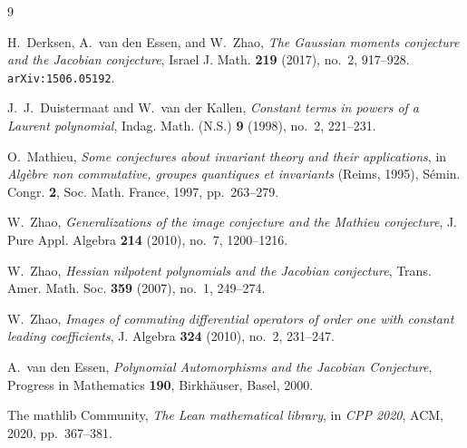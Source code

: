 \documentclass[11pt,reqno]{amsart}
\theoremstyle{plain}
\theoremstyle{definition}
\begin{document}
\begin{thebibliography}{9}

H.~Derksen, A.~van den Essen, and W.~Zhao,
\emph{The Gaussian moments conjecture and the Jacobian conjecture},
Israel J. Math. \textbf{219} (2017), no.~2, 917--928. \texttt{arXiv:1506.05192}.

J.~J.~Duistermaat and W.~van der Kallen,
\emph{Constant terms in powers of a Laurent polynomial},
Indag. Math. (N.S.) \textbf{9} (1998), no.~2, 221--231.

O.~Mathieu,
\emph{Some conjectures about invariant theory and their applications},
in \emph{Alg\`ebre non commutative, groupes quantiques et invariants}
(Reims, 1995), S\'emin. Congr. \textbf{2}, Soc. Math. France, 1997, pp.~263--279.

W.~Zhao,
\emph{Generalizations of the image conjecture and the Mathieu conjecture},
J. Pure Appl. Algebra \textbf{214} (2010), no.~7, 1200--1216.

W.~Zhao,
\emph{Hessian nilpotent polynomials and the Jacobian conjecture},
Trans. Amer. Math. Soc. \textbf{359} (2007), no.~1, 249--274.

W.~Zhao,
\emph{Images of commuting differential operators of order one with constant leading coefficients},
J. Algebra \textbf{324} (2010), no.~2, 231--247.

A.~van den Essen,
\emph{Polynomial Automorphisms and the Jacobian Conjecture},
Progress in Mathematics \textbf{190}, Birkh\"auser, Basel, 2000.

The mathlib Community,
\emph{The Lean mathematical library},
in \emph{CPP 2020}, ACM, 2020, pp.~367--381.

\end{thebibliography}
\end{document}
